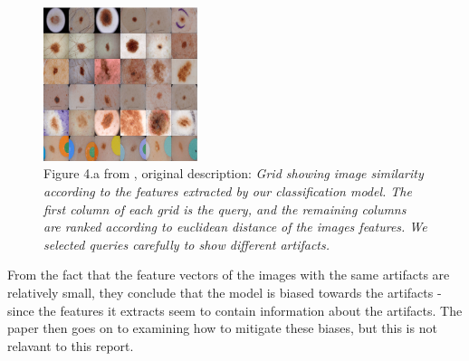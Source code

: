 \begin{figure}[h]
    \centering
    \includegraphics[width=0.4\textwidth]{images/not-so-fast-artifact-query.png}
    \caption{Figure 4.a from \cite{debias-not-so-fast}, original description: \textit{Grid showing image similarity according to the features extracted by our classification model. The first column
            of each grid is the query, and the remaining columns are ranked according to euclidean distance of the images features.
            We selected queries carefully to show different artifacts.}}
    \label{fig:not-so-fast-artifact-query}
\end{figure}

From the fact that the feature vectors of the images with the same artifacts are relatively small,
they conclude that the model is biased towards the artifacts - since the features it extracts seem to contain information about the artifacts.
The paper then goes on to examining how to mitigate these biases, but this is not relavant to this report.